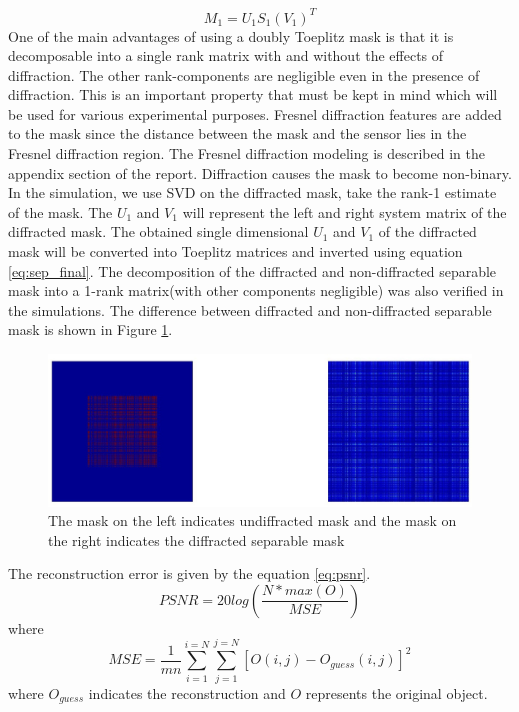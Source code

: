\begin{equation}
\label{eq:svd_2}
M_{1} = U_{1}S_1(V_{1})^T
\end{equation}
One of the main advantages of using a doubly Toeplitz mask is that it is decomposable into a single rank matrix with and without the effects of diffraction. The other rank-components are negligible even in the presence of diffraction. This is an important property that must be kept in mind which will be used for various experimental purposes. Fresnel diffraction features are added to the mask since the distance between the mask and the sensor lies in the Fresnel diffraction region. The Fresnel diffraction modeling is described in the appendix section of the report. Diffraction causes the mask to become non-binary.  In the simulation, we use SVD on the diffracted mask, take the rank-1 estimate of the mask. The $U_1$ and $V_1$ will represent the left and right system matrix of the diffracted mask. The obtained single dimensional $U_1$ and $V_1$ of the diffracted mask will be converted into Toeplitz matrices and inverted using equation \ref{eq:sep_final}. The decomposition of the diffracted and non-diffracted separable mask into a 1-rank matrix(with other components negligible) was also verified in the simulations.
The difference between diffracted and non-diffracted separable mask is shown in Figure \ref{fig:diff_separable}. 

\begin{figure}[ht]
\includegraphics[width=\linewidth]{pics/diffracted_mask}
\caption{The mask on the left indicates undiffracted mask and the mask on the right indicates the diffracted separable mask}
\label{fig:diff_separable}
\end{figure}

The reconstruction error is given by the equation \ref{eq:psnr}.  
\begin{equation}
PSNR = 20log(\frac{N*max(O)}{MSE})
\label{eq:psnr}
\end{equation}
where 
\begin{equation}
MSE = \frac{1}{mn}\sum_{i=1}^{i=N}\sum_{j=1}^{j=N}[O(i,j) - O_{guess}(i,j)]^2
\end{equation}
where $O_{guess}$ indicates the reconstruction and $O$ represents the original object.

